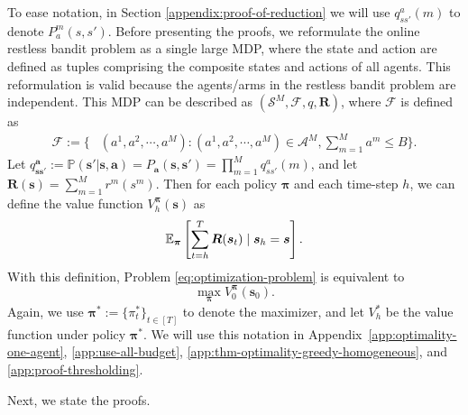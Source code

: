 To ease notation, in Section \ref{appendix:proof-of-reduction} we will use $q^a_{ss'}(m)$ to denote $P_a^m(s,s')$.
Before presenting the proofs, we reformulate the online restless bandit problem as a single large MDP, where the state and action are defined as tuples comprising the composite states and actions of all agents. This reformulation is valid because the agents/arms in the restless bandit problem are independent. This MDP can be described as
$\left(\mathcal{S}^M,\mathcal{F},q,\bm{R}\right)$, where $\mathcal{F}$ is defined as
\begin{align*}
    \mathcal{F}:=\bigg\{&\left(a^1,a^2,\cdots,a^M\right):\left(a^1,a^2,\cdots,a^M\right)\in\mathcal{A}^M, \sum_{m=1}^M a^m\leq B\bigg\}.
\end{align*}
Let $q_{\bm s \bm s'}^{\bm a}:=\mathbb{P}(\bm s'|\bm s, \bm a) = P_{\bm a}(\bm s, \bm s')= \prod_{m=1}^M 
q^{a}_{ss'}(m)$, and let
%
$\bm{R}(\bm{s})=\sum_{m=1}^M r^m\left(s^m\right)$.
Then for each policy $\bm{\pi}$ and each time-step $h$, we can define the value function $V_h^{\bm{\pi}}(\bm{s})$ as
\begin{equation}\label{eq:value-function}
    \mathbb{E}_{\bm{\pi}}\left[\sum_{t=h}^T \bm{R}(\bm{s}_t)\mid \bm{s}_h=\bm{s}\right].
\end{equation}
With this definition, Problem \eqref{eq:optimization-problem} is equivalent to
\begin{equation*}
    \max_{\bm{\pi}} V_0^{\bm{\pi}}\left(\bm{s}_0\right).
\end{equation*}
Again, we use $\bm \pi^*:= \{\pi_{t}^*\}_{t\in[T]}$ to denote the maximizer, and let $V_h^*$ be the value function under policy $\bm \pi^*$. We will use this notation in Appendix~\ref{app:optimality-one-agent}, \ref{app:use-all-budget}, \ref{app:thm-optimality-greedy-homogeneous}, and \ref{app:proof-thresholding}.


Next, we state the proofs.
